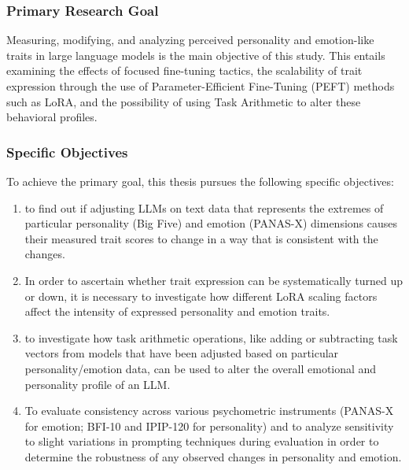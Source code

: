 \documentclass{DESSThesis}
\begin{document}
\subsubsection{Primary Research Goal}
Measuring, modifying, and analyzing perceived personality and emotion-like traits in large language models is the main objective of this study. This entails examining the effects of focused fine-tuning tactics, the scalability of trait expression through the use of Parameter-Efficient Fine-Tuning (PEFT) methods such as LoRA, and the possibility of using Task Arithmetic to alter these behavioral profiles.

\subsubsection{Specific Objectives}
To achieve the primary goal, this thesis pursues the following specific objectives:
\begin{enumerate}
\item to find out if adjusting LLMs on text data that represents the extremes of particular personality (Big Five) and emotion (PANAS-X) dimensions causes their measured trait scores to change in a way that is consistent with the changes.
\item In order to ascertain whether trait expression can be systematically turned up or down, it is necessary to investigate how different LoRA scaling factors affect the intensity of expressed personality and emotion traits.
\item to investigate how task arithmetic operations, like adding or subtracting task vectors from models that have been adjusted based on particular personality/emotion data, can be used to alter the overall emotional and personality profile of an LLM.
\item To evaluate consistency across various psychometric instruments (PANAS-X for emotion; BFI-10 and IPIP-120 for personality) and to analyze sensitivity to slight variations in prompting techniques during evaluation in order to determine the robustness of any observed changes in personality and emotion.
\end{enumerate}
\end{document}
